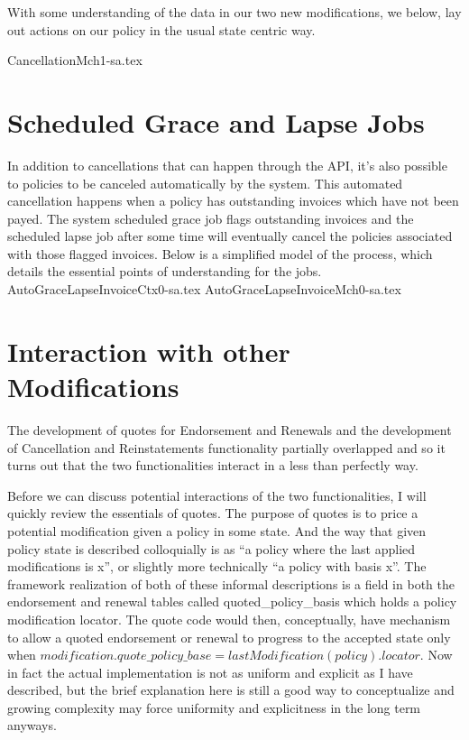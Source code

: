 With some understanding of the data in our two new modifications, we below, lay out actions on our policy in the usual
state centric way. 

{CancellationMch1-sa.tex}

\section{Scheduled Grace and Lapse Jobs}
In addition to cancellations that can happen through the API, it's also possible to policies to be canceled automatically by
the system. This automated cancellation happens when a policy has outstanding invoices which have not been payed. The system
scheduled grace job flags outstanding invoices and the scheduled lapse job after some time will eventually cancel the policies
associated with those flagged invoices. Below is a simplified model of the process, which details the essential points of
understanding for the jobs.
{AutoGraceLapseInvoiceCtx0-sa.tex}
{AutoGraceLapseInvoiceMch0-sa.tex}

\section{Interaction with other Modifications}
The development of quotes for Endorsement and Renewals and the development of Cancellation and Reinstatements functionality
partially overlapped and so it turns out that the two functionalities interact in a less than perfectly way.

Before we can discuss potential interactions of the two functionalities, I will quickly review the essentials of quotes. The
purpose of quotes is to price a potential modification given a policy in some state. And the way that given policy state is described
colloquially is as ``a policy where the last applied modifications is x'', or slightly more technically ``a policy with basis x''. The
framework realization of both of these informal descriptions is a field in both the endorsement and
renewal tables called quoted\_policy\_basis which holds a policy modification locator. The quote code would then, conceptually, have
mechanism to allow a quoted endorsement or renewal to progress to the accepted state only when
$ modification.quote\_policy\_base = lastModification(policy).locator $. Now in
fact the actual implementation is not as uniform and explicit as I have described, but the brief explanation here is still a good way
to conceptualize and growing complexity may force uniformity and explicitness in the long term anyways.

